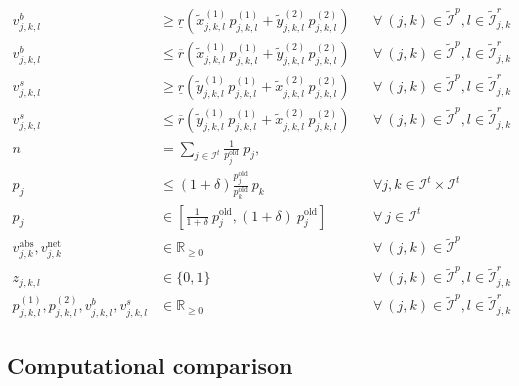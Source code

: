\documentclass[11pt,parskip=full]{scrartcl}%
\newcommand*{\itokens}{\mathcal{I}^t}       %
\newcommand*{\iutokenpairs}{\tilde{\mathcal{I}}^p}   %
\begin{document}
\begin{small}
\begin{subequations}
\begin{align}
  v^b_{j,k,l}
  &\ge \underline{r} \left( \tilde{x}^{(1)}_{j,k,l} \, p^{(1)}_{j,k,l} + \tilde{y}^{(2)}_{j,k,l} \,
  p^{(2)}_{j,k,l} \right)
  && \forall \> (j,k) \in \iutokenpairs, l \in \tilde{\mathcal{I}}_{j,k}^r
  \label{eq:mip3_buyvolume_lb}
  \\[0mm]
  v^b_{j,k,l}
  &\le \overline{r} \left( \tilde{x}^{(1)}_{j,k,l} \, p^{(1)}_{j,k,l} + \tilde{y}^{(2)}_{j,k,l} \,
  p^{(2)}_{j,k,l} \right)
  && \forall \> (j,k) \in \iutokenpairs, l \in \tilde{\mathcal{I}}_{j,k}^r
  \label{eq:mip3_buyvolume_ub}
  \\[0mm]
  v^s_{j,k,l}
  &\ge \underline{r} \left( \tilde{y}^{(1)}_{j,k,l} \, p^{(1)}_{j,k,l} + \tilde{x}^{(2)}_{j,k,l} \,
  p^{(2)}_{j,k,l} \right)
  && \forall \> (j,k) \in \iutokenpairs, l \in \tilde{\mathcal{I}}_{j,k}^r
  \label{eq:mip3_sellvolume_lb}
  \\[0mm]
  v^s_{j,k,l}
  &\le \overline{r} \left( \tilde{y}^{(1)}_{j,k,l} \, p^{(1)}_{j,k,l} + \tilde{x}^{(2)}_{j,k,l} \,
  p^{(2)}_{j,k,l} \right)
  && \forall \> (j,k) \in \iutokenpairs, l \in \tilde{\mathcal{I}}_{j,k}^r
  \label{eq:mip3_sellvolume_ub}
  \\[0mm]
  n
  &= \sum\limits_{j \in \itokens} \frac{1}{p^\mathrm{old}_j} \> p_j,
  \label{eq:mip3_reftoken}
  \\[0mm]
  p_j
  &\le \left(1+\delta\right) \frac{p^\mathrm{old}_j}{p^\mathrm{old}_k} \, p_k
  && \forall j,k \in \itokens \times \itokens
  \label{eq:mip3_maxfluct}
  \\[0mm]
  p_j
  &\in \left[ \frac{1}{1+\delta} \> p^\mathrm{old}_j, (1+\delta) \> p^\mathrm{old}_j \right]
  && \forall \> j \in \itokens
  \\[0mm]
  v_{j,k}^\mathrm{abs}, v_{j,k}^\mathrm{net}
  &\in \mathbb{R}_{\ge 0}
  && \forall \> (j,k) \in \iutokenpairs
  \\[0mm]
  z_{j,k,l}
  &\in \{0,1\}
  && \forall \> (j,k) \in \iutokenpairs, l \in \tilde{\mathcal{I}}_{j,k}^r
  \\[0mm]
  p^{(1)}_{j,k,l}, p^{(2)}_{j,k,l}, v^b_{j,k,l}, v^s_{j,k,l}
  &\in \mathbb{R}_{\ge 0}
  && \forall \> (j,k) \in \iutokenpairs, l \in \tilde{\mathcal{I}}_{j,k}^r
\end{align}
\label{eq:mip3}
\end{subequations}
\end{small}


\subsection{Computational comparison}
\label{subsec:computational_comparison}
\end{document}
